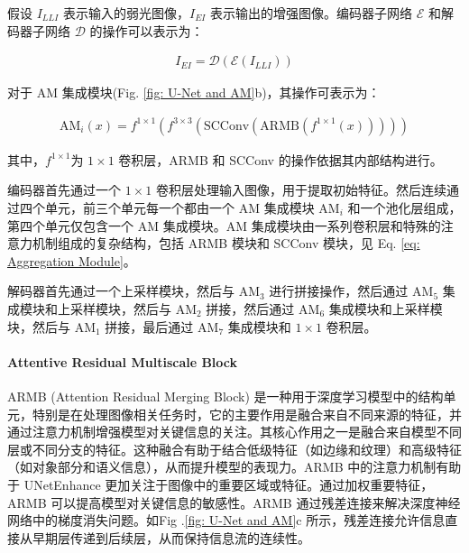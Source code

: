\documentclass[a4paper]{ctexart}
\begin{document}
	假设 $I_{LLI}$ 表示输入的弱光图像，$I_{EI}$ 表示输出的增强图像。编码器子网络 $\mathcal{E}$ 和解码器子网络 $\mathcal{D}$ 的操作可以表示为：
	
	\begin{equation}
		\begin{aligned}
			I_{EI} = \mathcal{D} \left( \mathcal{E} \left( I_{LLI} \right) \right)
		\end{aligned}
		\label{eq: UNetEnhance model}
	\end{equation}
	
	对于 AM 集成模块(Fig. \ref{fig: U-Net and AM}b)，其操作可表示为：
	
	\begin{equation}
		\begin{aligned}
			\text{AM}_{i}(x) = f^{1 \times 1} \left(f^{3 \times 3} \left(\text{SCConv}\left( \text{ARMB} \left( f^{1 \times 1} (x)\right)\right)\right)\right)
		\end{aligned}
		\label{eq: Aggregation Module}
	\end{equation}
	
	其中，$f^{1\times1}$为 $1 \times 1$ 卷积层，ARMB 和 SCConv 的操作依据其内部结构进行。
	
	编码器首先通过一个 $1 \times 1$ 卷积层处理输入图像，用于提取初始特征。然后连续通过四个单元，前三个单元每一个都由一个 AM 集成模块 $\text{AM}_i$ 和一个池化层组成，第四个单元仅包含一个 AM 集成模块。AM 集成模块由一系列卷积层和特殊的注意力机制组成的复杂结构，包括 ARMB 模块和 SCConv 模块，见 Eq. \ref{eq: Aggregation Module}。
	
	解码器首先通过一个上采样模块，然后与 $\text{AM}_{3}$ 进行拼接操作，然后通过 $\text{AM}_{5}$ 集成模块和上采样模块，然后与 $\text{AM}_{2}$ 拼接，然后通过 $\text{AM}_{6}$ 集成模块和上采样模块，然后与 $\text{AM}_{1}$ 拼接，最后通过 $\text{AM}_{7}$ 集成模块和 $1 \times 1$ 卷积层。
	
	\paragraph{Attentive Residual Multiscale Block}
	
	ARMB (Attention Residual Merging Block) 是一种用于深度学习模型中的结构单元，特别是在处理图像相关任务时，它的主要作用是融合来自不同来源的特征，并通过注意力机制增强模型对关键信息的关注。其核心作用之一是融合来自模型不同层或不同分支的特征。这种融合有助于结合低级特征（如边缘和纹理）和高级特征（如对象部分和语义信息），从而提升模型的表现力。ARMB 中的注意力机制有助于 UNetEnhance 更加关注于图像中的重要区域或特征。通过加权重要特征，ARMB 可以提高模型对关键信息的敏感性。ARMB 通过残差连接来解决深度神经网络中的梯度消失问题。如Fig .\ref{fig: U-Net and AM}c 所示，残差连接允许信息直接从早期层传递到后续层，从而保持信息流的连续性。
	
\end{document}
